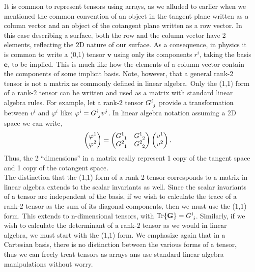 \begin{appendices}
It is common to represent tensors using arrays, as we alluded to earlier when we mentioned the common convention of an object in the tangent plane written as a column vector and an object of the cotangent plane written as a row vector.
In this case describing a surface, both the row and the column vector have 2 elements, reflecting the 2D nature of our surface.
As a consequence, in physics it is common to write a (0,1) tensor $\mathbf{v}$ using only its components $r^i$, taking the basis $\mathbf{e}_i$ to be implied.
This is much like how the elements of a column vector contain the components of some implicit basis.
Note, however, that a general rank-2 tensor is not a matrix as commonly defined in linear algebra.
Only the (1,1) form of a rank-2 tensor can be written and used as a matrix with standard linear algebra rules.
For example, let a rank-2 tensor $\tensor{G}{^i_j}$ provide a transformation between $v^i$ and $\varphi^i$ like: $\varphi^i = \tensor{G}{^i_j}v^j$.
In linear algebra notation assuming a 2D space we can write,
\begin{equation}
  \begin{pmatrix}
    \varphi^1 \\
    \varphi^2
  \end{pmatrix} =
  \begin{pmatrix}
    \tensor{G}{^1_1} & \tensor{G}{^1_2} \\
    \tensor{G}{^2_1} & \tensor{G}{^2_2}
  \end{pmatrix}
  \begin{pmatrix}
    v^1 \\
    v^2
  \end{pmatrix}.
\end{equation}
Thus, the 2 ``dimensions'' in a matrix really represent 1 copy of the tangent space and 1 copy of the cotangent space. \\

The distinction that the (1,1) form of a rank-2 tensor corresponds to a matrix in linear algebra extends to the scalar invariants as well.
Since the scalar invariants of a tensor are independent of the basis, if we wish to calculate the trace of a rank-2 tensor as the sum of its diagonal components, then we must use the (1,1) form.
This extends to n-dimensional tensors, with $\textrm{Tr}\{ \mathbf{G} \} = \tensor{G}{^i_i}$.
Similarly, if we wish to calculate the determinant of a rank-2 tensor as we would in linear algebra, we must start with the (1,1) form.
We emphasize again that in a Cartesian basis, there is no distinction between the various forms of a tensor, thus we can freely treat tensors as arrays ans use standard linear algebra manipulations without worry. \\


\end{appendices}
